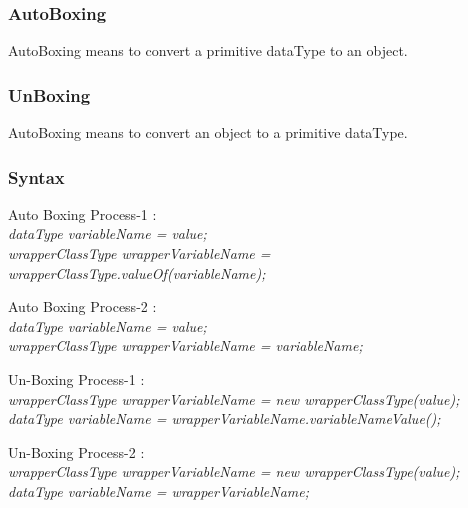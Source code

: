 \documentclass[openany]{book}  %
\begin{document}
\subsubsection{AutoBoxing}
AutoBoxing means to convert a primitive dataType to an object.
% 
% 
\subsubsection{UnBoxing}
AutoBoxing means to convert an object to a primitive dataType.
% 
% 
\subsubsection{Syntax}
\begin{center}
    \tt{
        \raggedright{Auto Boxing Process-1 : \\}
        \textit{
            dataType variableName = value;\\
            wrapperClassType wrapperVariableName = wrapperClassType.valueOf(variableName);\\
        }
        \newpage
        \raggedright{Auto Boxing Process-2 : \\}
        \textit{
            dataType variableName = value;\\
            wrapperClassType wrapperVariableName = variableName;\\
        }
        \vskip 0.5cm
        \raggedright{Un-Boxing Process-1 : \\}
        \textit{
            wrapperClassType wrapperVariableName = new wrapperClassType(value);
            dataType variableName = wrapperVariableName.variableNameValue();
        }
        \vskip 0.5cm
        \raggedright{Un-Boxing Process-2 : \\}
        \textit{
            wrapperClassType wrapperVariableName = new wrapperClassType(value);\\
            dataType variableName = wrapperVariableName;\\
        }
    }
\end{center}
% 
% 
\end{document}
